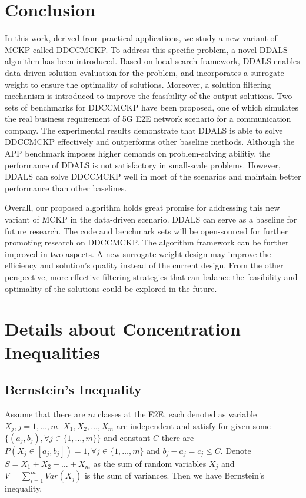 \documentclass[lettersize,journal]{IEEEtran}
\begin{document}
\section{Conclusion}
\label{section:con}
In this work, derived from practical applications, we study a new variant of MCKP called DDCCMCKP. 
To address this specific problem, a novel DDALS algorithm has been introduced.
Based on local search framework, DDALS enables data-driven solution evaluation for the problem,  and incorporates a surrogate weight to ensure the optimality of solutions. 
Moreover, a solution filtering mechanism is introduced to improve the feasibility of the output solutions. 
Two sets of benchmarks for DDCCMCKP have been proposed, one of which simulates the real business requirement of 5G E2E network scenario for a communication company. 
The experimental results demonstrate that DDALS is able to solve DDCCMCKP effectively and outperforms other baseline methods.
Although the APP benchmark imposes higher demands on problem-solving abilitiy, the performance of DDALS is not satisfactory in small-scale problems. 
However, DDALS can solve DDCCMCKP well in most of the scenarios and maintain better performance than other baselines.

Overall, our proposed algorithm holds great promise for addressing this new variant of MCKP in the data-driven scenario. 
DDALS can serve as a baseline for future research. The code and benchmark sets will be open-sourced for further promoting research on DDCCMCKP.
The algorithm framework can be further improved in two aspects. 
A new surrogate weight design may improve the efficiency and solution's quality instead of the current design.
From the other perspective, more effective filtering strategies that can balance the feasibility and optimality of the solutions could be explored in the future.


\appendices
\section{Details about Concentration Inequalities}
\subsection{Bernstein's Inequality}
Assume that there are $m$ classes at the E2E, each denoted as variable $X_j,j=1,\ldots,m$. 
$X_1,X_2,\ldots,X_m$ are independent and satisfy for given some $\{(a_j,b_j),\forall{j}\in\{1,\ldots,m\} \}$ and constant $C$ there are $P(X_j\in [a_j,b_j])=1, \forall{j}\in\{1,\ldots,m\}$ and $b_j-a_j=c_j\leq C$. 
Denote $S=X_1+X_2+\ldots+X_m$ as the sum of random variables $X_j$ and $V=\sum_{i=1}^{m}Var(X_j)$ is the sum of variances. 
Then we have Bernstein's inequality,
\end{document}
